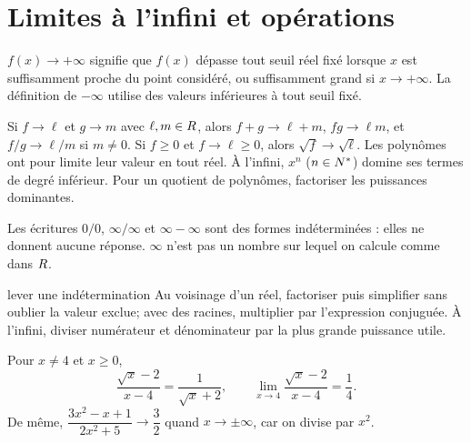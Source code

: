 \section{Limites à l’infini et opérations}
\begin{definition}
$f(x)\to+\infty$ signifie que $f(x)$ dépasse tout seuil réel fixé lorsque $x$ est suffisamment proche du point considéré, ou suffisamment grand si $x\to+\infty$. La définition de $-\infty$ utilise des valeurs inférieures à tout seuil fixé.
\end{definition}
\begin{propriete}
Si $f\to\ell$ et $g\to m$ avec $\ell,m\in R$, alors $f+g\to\ell+m$, $fg\to\ell m$, et $f/g\to\ell/m$ si $m\ne0$. Si $f\ge0$ et $f\to\ell\ge0$, alors $\sqrt f\to\sqrt\ell$. Les polynômes ont pour limite leur valeur en tout réel. À l’infini, $x^n$ ($n\in N^*$) domine ses termes de degré inférieur. Pour un quotient de polynômes, factoriser les puissances dominantes.
\end{propriete}
\begin{avertissement}Les écritures $0/0$, $\infty/\infty$ et $\infty-\infty$ sont des formes indéterminées : elles ne donnent aucune réponse. $\infty$ n’est pas un nombre sur lequel on calcule comme dans $R$.\end{avertissement}
\begin{methode}{lever une indétermination}
Au voisinage d’un réel, factoriser puis simplifier sans oublier la valeur exclue; avec des racines, multiplier par l’expression conjuguée. À l’infini, diviser numérateur et dénominateur par la plus grande puissance utile.
\end{methode}
\begin{exemple}
Pour $x\ne4$ et $x\ge0$,
\[
\frac{\sqrt x-2}{x-4}=\frac1{\sqrt x+2},\qquad
\lim_{x\to4}\frac{\sqrt x-2}{x-4}=\frac14.
\]
De même, $\dfrac{3x^2-x+1}{2x^2+5}\to\dfrac32$ quand $x\to\pm\infty$, car on divise par $x^2$.
\end{exemple}
